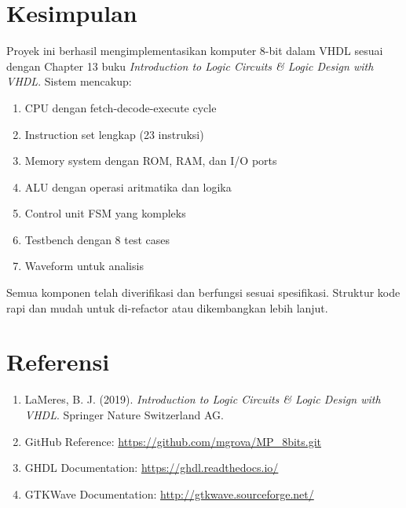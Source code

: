 \documentclass[12pt,a4paper]{report}
\begin{document}
\chapter{Kesimpulan}

Proyek ini berhasil mengimplementasikan komputer 8-bit dalam VHDL sesuai dengan Chapter 13 buku \textit{Introduction to Logic Circuits \& Logic Design with VHDL}. Sistem mencakup:

\begin{enumerate}
  \item CPU dengan fetch-decode-execute cycle
  \item Instruction set lengkap (23 instruksi)
  \item Memory system dengan ROM, RAM, dan I/O ports
  \item ALU dengan operasi aritmatika dan logika
  \item Control unit FSM yang kompleks
  \item Testbench dengan 8 test cases
  \item Waveform untuk analisis
\end{enumerate}

Semua komponen telah diverifikasi dan berfungsi sesuai spesifikasi. Struktur kode rapi dan mudah untuk di-refactor atau dikembangkan lebih lanjut.

\appendix

\chapter{Referensi}

\begin{enumerate}
  \item LaMeres, B. J. (2019). \textit{Introduction to Logic Circuits \& Logic Design with VHDL}. Springer Nature Switzerland AG.
  \item GitHub Reference: \url{https://github.com/mgrova/MP_8bits.git}
  \item GHDL Documentation: \url{https://ghdl.readthedocs.io/}
  \item GTKWave Documentation: \url{http://gtkwave.sourceforge.net/}
\end{enumerate}
\end{document}

